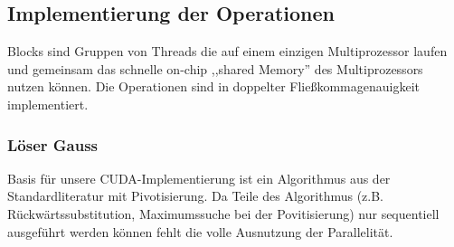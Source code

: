 \documentclass[journal]{IEEEtran}
\begin{document}
\subsection{Implementierung der Operationen}

Blocks sind Gruppen von Threads die auf einem einzigen Multiprozessor laufen
und gemeinsam das schnelle on-chip ,,shared Memory''
des Multiprozessors nutzen können. \cite{cudapg}
Die Operationen sind in doppelter Fließkommagenauigkeit implementiert.







\subsubsection{Löser Gauss}
Basis für unsere CUDA-Implementierung ist ein Algorithmus aus der
Standardliteratur \cite{sedgewick} mit Pivotisierung.
Da Teile des Algorithmus (z.B. Rückwärtssubstitution, Maximumssuche bei der
Povitisierung) nur sequentiell ausgeführt werden können fehlt die volle
Ausnutzung der Parallelität.

%
%

\end{document}
